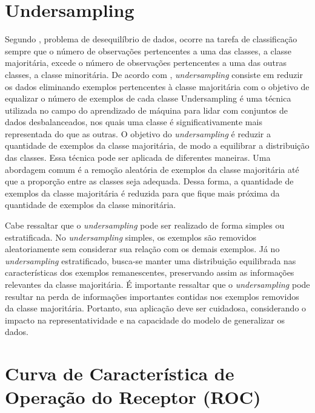 \documentclass[12pt,oneside,a4paper,chapter=TITLE,
			   english,brazil]{abntex2}
\begin{document}
\vspace{\onelineskip}

\section{Undersampling}

\vspace{\onelineskip}

Segundo  ,  problema de desequilíbrio de dados, ocorre na tarefa de classificação sempre que o número de observações pertencentes a uma das classes, a classe majoritária, excede o número de observações pertencentes a uma das outras classes, a classe minoritária. De acordo com ,  \textit{undersampling} consiste em reduzir os dados eliminando exemplos pertencentes à classe majoritária com o objetivo de equalizar o número de exemplos de cada classe
Undersampling é uma técnica utilizada no campo do aprendizado de máquina para lidar com conjuntos de dados desbalanceados, nos quais uma classe é significativamente mais representada do que as outras. O objetivo do \textit{undersampling} é reduzir a quantidade de exemplos da classe majoritária, de modo a equilibrar a distribuição das classes. Essa técnica pode ser aplicada de diferentes maneiras. Uma abordagem comum é a remoção aleatória de exemplos da classe majoritária até que a proporção entre as classes seja adequada. Dessa forma, a quantidade de exemplos da classe majoritária é reduzida para que fique mais próxima da quantidade de exemplos da classe minoritária.

Cabe ressaltar que o \textit{undersampling} pode ser realizado de forma simples ou estratificada. No \textit{undersampling} simples, os exemplos são removidos aleatoriamente sem considerar sua relação com os demais exemplos. Já no \textit{undersampling} estratificado, busca-se manter uma distribuição equilibrada nas características dos exemplos remanescentes, preservando assim as informações relevantes da classe majoritária. É importante ressaltar que o \textit{undersampling} pode resultar na perda de informações importantes contidas nos exemplos removidos da classe majoritária. Portanto, sua aplicação deve ser cuidadosa, considerando o impacto na representatividade e na capacidade do modelo de generalizar os dados.


\vspace{\onelineskip}
\section{Curva de Característica de Operação do Receptor (ROC)}
\vspace{\onelineskip}
\end{document}
